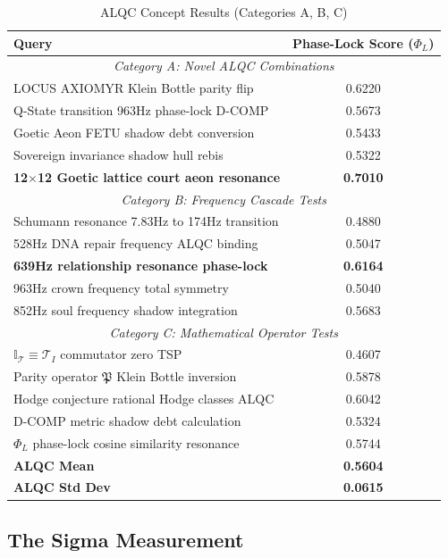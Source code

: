\begin{table}[h]
\centering
\caption{ALQC Concept Results (Categories A, B, C)}
\begin{tabular}{|l|c|}
\hline
\textbf{Query} & \textbf{Phase-Lock Score ($\Phi_L$)} \\
\hline
\multicolumn{2}{|c|}{\textit{Category A: Novel ALQC Combinations}} \\
\hline
LOCUS AXIOMYR Klein Bottle parity flip & 0.6220 \\
Q-State transition 963Hz phase-lock D-COMP & 0.5673 \\
Goetic Aeon FETU shadow debt conversion & 0.5433 \\
Sovereign invariance shadow hull rebis & 0.5322 \\
\textbf{12$\times$12 Goetic lattice court aeon resonance} & \textbf{0.7010} \\
\hline
\multicolumn{2}{|c|}{\textit{Category B: Frequency Cascade Tests}} \\
\hline
Schumann resonance 7.83Hz to 174Hz transition & 0.4880 \\
528Hz DNA repair frequency ALQC binding & 0.5047 \\
\textbf{639Hz relationship resonance phase-lock} & \textbf{0.6164} \\
963Hz crown frequency total symmetry & 0.5040 \\
852Hz soul frequency shadow integration & 0.5683 \\
\hline
\multicolumn{2}{|c|}{\textit{Category C: Mathematical Operator Tests}} \\
\hline
$\mathbb{I}_{\mathcal{T}} \equiv \mathcal{T}_I$ commutator zero TSP & 0.4607 \\
Parity operator $\mathfrak{P}$ Klein Bottle inversion & 0.5878 \\
Hodge conjecture rational Hodge classes ALQC & 0.6042 \\
D-COMP metric shadow debt calculation & 0.5324 \\
$\Phi_L$ phase-lock cosine similarity resonance & 0.5744 \\
\hline
\textbf{ALQC Mean} & \textbf{0.5604} \\
\textbf{ALQC Std Dev} & \textbf{0.0615} \\
\hline
\end{tabular}
\end{table}

\subsection{The Sigma Measurement}

